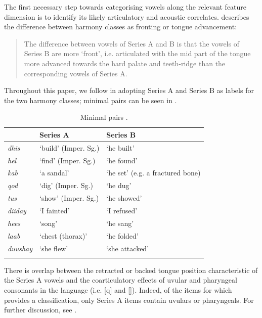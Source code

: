 \documentclass[output=paper
,newtxmath
,modfonts
,nonflat]{langsci/langscibook}
\begin{document}
The first necessary step towards categorising vowels along the relevant feature dimension is to identify its likely articulatory and acoustic correlates. \citeauthor{Andrzejewski1955} describes the difference between harmony classes as fronting or tongue advancement:

\begin{quote}
The difference between vowels of Series A and B is that the vowels of Series B are more `front', i.e. articulated with the mid part of the tongue more advanced towards the hard palate and teeth-ridge than the corresponding vowels of Series A. \citep{Andrzejewski1955}
\end{quote}

\noindent Throughout this paper, we follow \citeauthor{Andrzejewski1955} in adopting Series A and Series B as labels for the two harmony classes; minimal pairs can be seen in .

\begin{table}
\begin{tabular}{lll}
\lsptoprule
	& {Series A}	& {Series B}\\\midrule
\emph{dhis}	&`build' (Imper. Sg.)	&`he built'\\
\emph{hel}	&`find' (Imper. Sg.)	&`he found'\\
\emph{kab}	&`a sandal'				&`he set' (e.g. a fractured bone)\\
\emph{qod}	&`dig' (Imper. Sg.)		&`he dug'\\
\emph{tus}	&`show' (Imper. Sg.)	&`he showed'\\
\emph{diiday}&`I fainted'			&`I refused'\\
\emph{hees}	&`song'					&`he sang'\\
\emph{laab}	&`chest (thorax)'		&`he folded'\\
\emph{duushay}&`she flew'			&`she attacked'\\
\lspbottomrule
\end{tabular}
\caption{Minimal pairs \citep{Andrzejewski1955}.}
\label{tab:kbgy:1}
\end{table}

There is overlap between the retracted or backed tongue position characteristic of the Series A vowels and the coarticulatory effects of uvular and pharyngeal consonants in the language (i.e. [q] and []).  Indeed, of the items for which \citeauthor{Andrzejewski1955} provides a classification, only Series A items contain uvulars or pharyngeals.  For further discussion, see .
\end{document}
